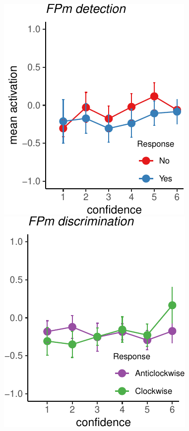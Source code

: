 \documentclass[]{article}
\begin{document}
~

\includegraphics{Chudi-Thesis_files/figure-latex/unnamed-chunk-11-1.pdf}
\includegraphics{Chudi-Thesis_files/figure-latex/unnamed-chunk-11-2.pdf}
\end{document}
